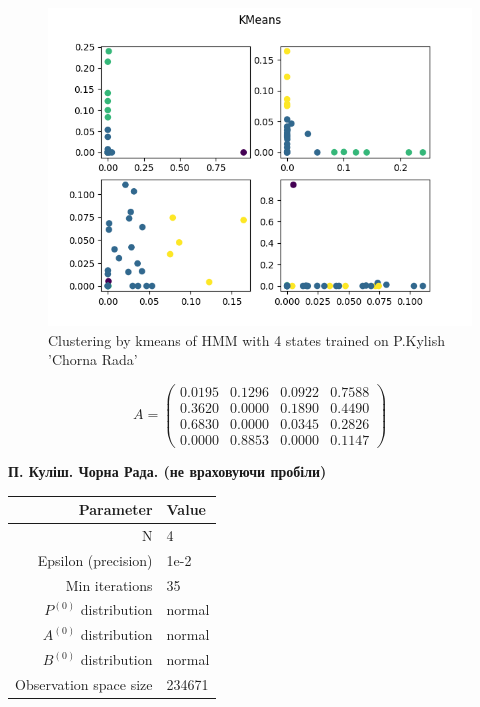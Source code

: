 \documentclass[12pt,a4paper]{article}
\begin{document}
  \begin{figure}[h]
    \includegraphics[width=\textwidth]{../plots/kylish-chorna-rada-clustering-4-kmeans-1671021354.8138266.png}
    \centering
    \caption{Clustering by kmeans of HMM with 4 states trained on P.Kylish 'Chorna Rada'}
  \end{figure}
	
  \[ A = \begin{pmatrix}
      0.0195 & 0.1296 & 0.0922 & 0.7588 \\
      0.3620 & 0.0000 & 0.1890 & 0.4490 \\
      0.6830 & 0.0000 & 0.0345 & 0.2826 \\
      0.0000 & 0.8853 & 0.0000 & 0.1147
  \end{pmatrix}  \] 

  \clearpage



  \textbf{П. Куліш. Чорна Рада. (не враховуючи пробіли)}

  \begin{center}
  \begin{tabular}{ | r | l | }
    \hline
    Parameter & Value \\
    \hline
    N & 4 \\
    \hline
    Epsilon (precision) & 1e-2 \\
    \hline
    Min iterations & 35 \\
    \hline
    $P^{(0)}$ distribution & normal \\
    \hline
    $A^{(0)}$ distribution & normal \\
    \hline
    $B^{(0)}$ distribution & normal \\
    \hline
    Observation space size & 234671 \\
    \hline
  \end{tabular}
  \end{center}
\end{document}
